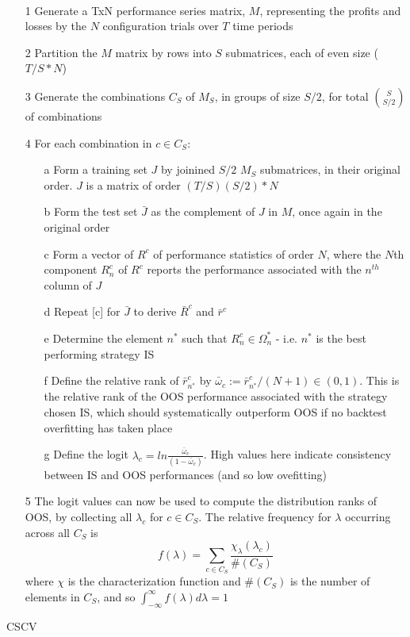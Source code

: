 \documentclass[a4paper,11pt,oneside]{article}
\theoremstyle{plain}
\theoremstyle{definition}
\begin{document}
	\begin{algorithm}[H]
		\texttt{\\}
		
		\begin{itemize}
			\item[1]Generate a TxN performance series matrix, $M$, representing the profits and losses by the $N$ configuration trials over $T$ time periods
			\item[2]Partition the $M$ matrix by rows into $S$ submatrices, each of even size ($T/S * N$)
			\item[3]Generate the combinations $C_S$ of $M_S$, in groups of size $S/2$, for total $\binom{S}{S/2}$ of combinations
			\item[4]For each combination in $c \in C_S$:
			\begin{itemize}
				\item [a] Form a training set $J$ by joinined $S/2$ $M_S$ submatrices, in their original order. $J$ is a matrix of order $(T/S)(S/2)*N $
				\item [b] Form the test set $\bar{J}$ as the complement of $J$ in $M$, once again in the original order
				\item [c] Form a vector of $R^c$ of performance statistics of order $N$, where the $N$th component $R_n^c$ of $R^c$ reports the performance associated with the $n^{th}$ column of $J$
				\item [d] Repeat [c] for $\bar{J}$ to derive $\bar{R}^c$ and $\bar{r}^c$
				\item [e] Determine the element $n^*$ such that $R^c_n \in \Omega^*_n$ - i.e. $n^*$ is the best performing strategy IS
				\item [f] Define the relative rank of $\bar{r}^c_{n^*}$ by $\bar{\omega}_c := \bar{r}^c_{n^*} / (N +1) \in (0,1)$. This is the relative rank of the OOS performance associated with the strategy chosen IS, which should systematically outperform OOS if no backtest overfitting has taken place
				\item[g] Define the logit $\lambda_c = ln \frac{\bar{\omega}_c}{(1-\bar{\omega}_c)}$. High values here indicate consistency between IS and OOS performances (and so low ovefitting)
			\end{itemize}
			\item [5] The logit values can now be used to compute the distribution ranks of OOS, by collecting all $\lambda_c$ for $c \in C_S$. The relative frequency for $\lambda$ occurring across all $C_S$ is 
			\begin{equation}
			f(\lambda) = \sum_{c \in C_S}\frac{\chi_{\lambda}(\lambda_c)}{\#(C_S)}
			\end{equation}
			where $\chi$ is the characterization function and $\#(C_S)$ is the number of elements in $C_S$, and so $\int_{-\infty}^{\infty} f (\lambda) d \lambda = 1$
		\end{itemize}
		
		\label{algo_cscv}
		\caption{CSCV}
	\end{algorithm}
	
\end{document}

